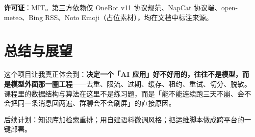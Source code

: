 \documentclass[11pt,a4paper]{ctexart}
\begin{document}
\textbf{许可证}：MIT。第三方依赖仅 OneBot v11 协议规范、NapCat 协议端、open-meteo、Bing RSS、Noto Emoji（占位素材），均在文档中标注来源。

\section{总结与展望}

这个项目让我真正体会到：\textbf{决定一个「AI 应用」好不好用的，往往不是模型，而是模型外面那一圈工程}——去重、限流、过期、缓存、租约、重试、切分、脱敏。课程里的数据结构与算法在这里不是练习题，而是「能不能连续跑三天不崩、会不会把同一条消息回两遍、群聊会不会刷屏」的直接原因。

后续计划：知识库加检索重排；用自建语料微调风格；把运维脚本做成跨平台的一键部署。
\end{document}
